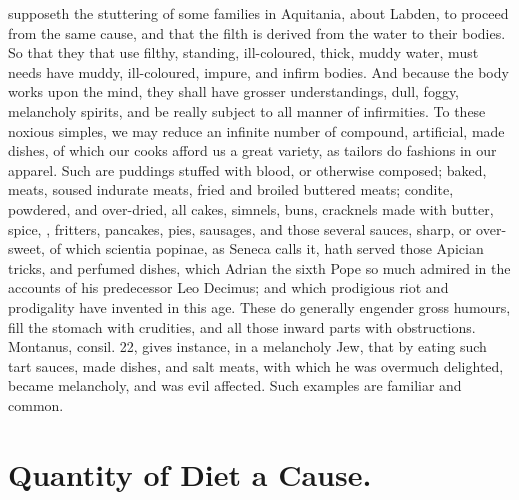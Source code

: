 {supposeth the stuttering of some families in Aquitania, about Labden,
to proceed from the same cause, and that the filth is derived from the
water to their bodies. So that they that use filthy, standing,
ill-coloured, thick, muddy water, must needs have muddy, ill-coloured,
impure, and infirm bodies. And because the body works upon the mind,
they shall have grosser understandings, dull, foggy, melancholy
spirits, and be really subject to all manner of infirmities.
To these noxious simples, we may reduce an infinite number of compound,
artificial, made dishes, of which our cooks afford us a great variety,
as tailors do fashions in our apparel. Such are puddings stuffed
with blood, or otherwise composed; baked, meats, soused indurate meats,
fried and broiled buttered meats; condite, powdered, and over-dried,
all cakes, simnels, buns, cracknels made with butter, spice, \etc{},
fritters, pancakes, pies, sausages, and those several sauces, sharp, or
over-sweet, of which scientia popinae, as Seneca calls it, hath served
those  Apician tricks, and perfumed dishes, which Adrian the
sixth Pope so much admired in the accounts of his predecessor Leo
Decimus; and which prodigious riot and prodigality have invented in
this age. These do generally engender gross humours, fill the stomach
with crudities, and all those inward parts with obstructions. Montanus,
consil. 22, gives instance, in a melancholy Jew, that by eating such
tart sauces, made dishes, and salt meats, with which he was overmuch
delighted, became melancholy, and was evil affected. Such examples are
familiar and common.

\section{Quantity of Diet a Cause.}

}
